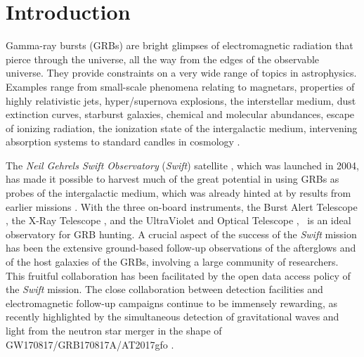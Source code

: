 \documentclass[longauth]{aa}    %
\begin{document}
\maketitle

\section{Introduction}

Gamma-ray bursts (GRBs) are bright glimpses of electromagnetic radiation that
pierce through the universe, all the way from the edges of the observable
universe. They provide constraints on a very wide range of topics in
astrophysics. Examples range from small-scale phenomena relating to magnetars,
properties of highly relativistic jets, hyper/supernova explosions, the
interstellar medium, dust extinction curves, starburst galaxies, chemical and
molecular abundances, escape of ionizing radiation, the ionization state of the
intergalactic medium, intervening absorption systems to standard candles in
cosmology \citep[e.g.,][]{Wijers1998, Savaglio2006, Ghirlanda2007, Molinari2007,
	Amati2008, Vergani2009, Prochaska2009, HjorthBloom2012, Rowlinson2017,
	Christensen2017}.

The \textit{Neil Gehrels Swift Observatory} ({\it Swift}) satellite
\citep{Gehrels2004, Gehrels2009}, which was launched in 2004, has made it
possible to harvest much of the great potential in using GRBs as probes of the
intergalactic medium, which was already hinted at by results from earlier
missions \citep[e.g.,][]{Paradijs2000, Ricker2004}. With the three on-board
instruments, the Burst Alert Telescope \citep[BAT;][]{Barthelmy2005}, the X-Ray
Telescope \citep[XRT;][]{Burrows2005}, and the UltraViolet and Optical Telescope
\citep[UVOT;][]{Roming2005}, \swift~is an ideal observatory for GRB hunting. A
crucial aspect of the success of the {\it Swift} mission has been the extensive
ground-based follow-up observations of the afterglows and of the host galaxies
of the GRBs, involving a large community of researchers. This fruitful
collaboration has been facilitated by the open data access policy of the {\it
	Swift} mission. The close collaboration between detection facilities and
electromagnetic  follow-up campaigns continue to be immensely rewarding, as
recently highlighted by the simultaneous detection of gravitational waves and
light from the neutron star merger in the shape of GW170817/GRB170817A/AT2017gfo
\citep{2017ApJ...848L..14G, 2017ApJ...848L..15S, 2017ApJ...848L..16S,
	2017ApJ...848L..17C, 2017ApJ...848L..18N, 2017ApJ...848L..19C,
	2017ApJ...848L..27T, 2017ApJ...850L...1L, 2017Natur.551...64A,
	2017Natur.551...67P, 2017Natur.551...71T, 2017Natur.551...75S,
	2017Sci...358.1583K, 2017Sci...358.1556C, Burgess2017, LIGOScientificCollaboration2017a,
	LIGOScientificCollaboration2017}.
\end{document}
